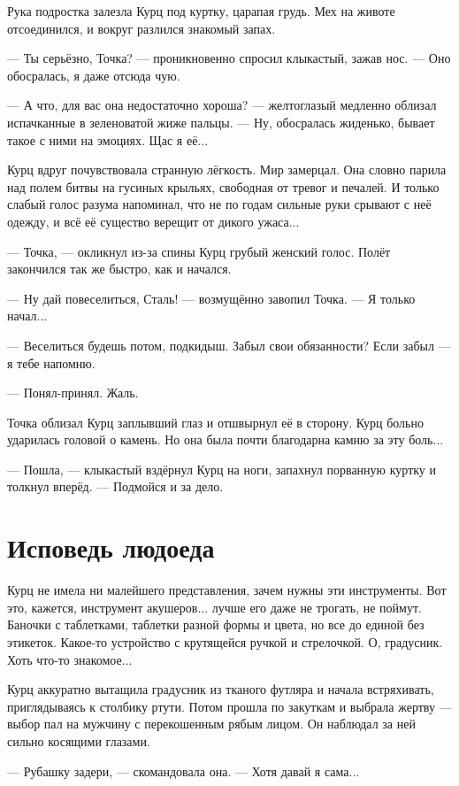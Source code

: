 Рука подростка залезла Курц под куртку, царапая грудь.
Мех на животе отсоединился, и вокруг разлился знакомый запах.

--- Ты серьёзно, Точка? --- проникновенно спросил клыкастый, зажав нос.
--- Оно обосралась, я даже отсюда чую.

--- А что, для вас она недостаточно хороша? --- желтоглазый медленно облизал испачканные в зеленоватой жиже пальцы.
--- Ну, обосралась жиденько, бывает такое с ними на эмоциях.
Щас я её...

Курц вдруг почувствовала странную лёгкость.
Мир замерцал.
Она словно парила над полем битвы на гусиных крыльях, свободная от тревог и печалей.
И только слабый голос разума напоминал, что не по годам сильные руки срывают с неё одежду, и всё её существо верещит от дикого ужаса...

--- Точка, --- окликнул из-за спины Курц грубый женский голос.
Полёт закончился так же быстро, как и начался.

--- Ну дай повеселиться, Сталь! --- возмущённо завопил Точка.
--- Я только начал...

--- Веселиться будешь потом, подкидыш.
Забыл свои обязанности?
Если забыл --- я тебе напомню.

--- Понял-принял.
Жаль.

Точка облизал Курц заплывший глаз и отшвырнул её в сторону.
Курц больно ударилась головой о камень.
Но она была почти благодарна камню за эту боль...

--- Пошла, --- клыкастый вздёрнул Курц на ноги, запахнул порванную куртку и толкнул вперёд.
--- Подмойся и за дело.

\section{Исповедь людоеда}

Курц не имела ни малейшего представления, зачем нужны эти инструменты.
Вот это, кажется, инструмент акушеров... лучше его даже не трогать, не поймут.
Баночки с таблетками, таблетки разной формы и цвета, но все до единой без этикеток.
Какое-то устройство с крутящейся ручкой и стрелочкой.
О, градусник.
Хоть что-то знакомое...

Курц аккуратно вытащила градусник из тканого футляра и начала встряхивать, приглядываясь к столбику ртути.
Потом прошла по закуткам и выбрала жертву --- выбор пал на мужчину с перекошенным рябым лицом.
Он наблюдал за ней сильно косящими глазами.

--- Рубашку задери, --- скомандовала она.
--- Хотя давай я сама...

